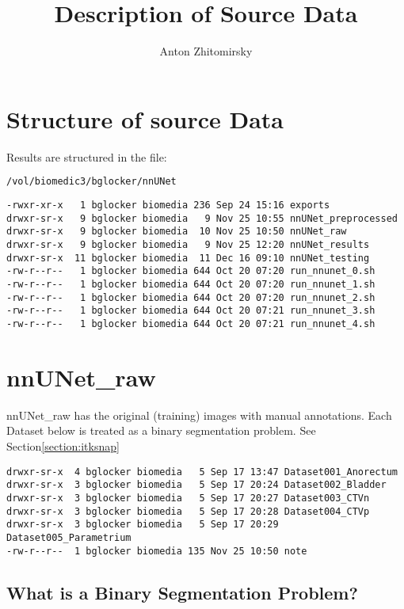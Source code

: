 \documentclass[11pt]{article}
\title{Description of Source Data}
\author{Anton Zhitomirsky}
\begin{document}
\maketitle

\section{Structure of source Data}

Results are structured in the file:

\begin{lstlisting}[language=bash]
/vol/biomedic3/bglocker/nnUNet
\end{lstlisting}

\begin{lstlisting}[language=inform]
-rwxr-xr-x   1 bglocker biomedia 236 Sep 24 15:16 exports
drwxr-sr-x   9 bglocker biomedia   9 Nov 25 10:55 nnUNet_preprocessed
drwxr-sr-x   9 bglocker biomedia  10 Nov 25 10:50 nnUNet_raw
drwxr-sr-x   9 bglocker biomedia   9 Nov 25 12:20 nnUNet_results
drwxr-sr-x  11 bglocker biomedia  11 Dec 16 09:10 nnUNet_testing
-rw-r--r--   1 bglocker biomedia 644 Oct 20 07:20 run_nnunet_0.sh
-rw-r--r--   1 bglocker biomedia 644 Oct 20 07:20 run_nnunet_1.sh
-rw-r--r--   1 bglocker biomedia 644 Oct 20 07:20 run_nnunet_2.sh
-rw-r--r--   1 bglocker biomedia 644 Oct 20 07:21 run_nnunet_3.sh
-rw-r--r--   1 bglocker biomedia 644 Oct 20 07:21 run_nnunet_4.sh
\end{lstlisting}

\section*{nnUNet\_raw}

nnUNet\_raw has the original (training) images with manual annotations. Each Dataset below is treated as a binary segmentation problem. See Section\ref{section:itksnap}

\begin{lstlisting}[language=inform]
drwxr-sr-x  4 bglocker biomedia   5 Sep 17 13:47 Dataset001_Anorectum
drwxr-sr-x  3 bglocker biomedia   5 Sep 17 20:24 Dataset002_Bladder
drwxr-sr-x  3 bglocker biomedia   5 Sep 17 20:27 Dataset003_CTVn
drwxr-sr-x  3 bglocker biomedia   5 Sep 17 20:28 Dataset004_CTVp
drwxr-sr-x  3 bglocker biomedia   5 Sep 17 20:29 Dataset005_Parametrium
-rw-r--r--  1 bglocker biomedia 135 Nov 25 10:50 note
\end{lstlisting}

\subsection*{What is a Binary Segmentation Problem?}
\end{document}
